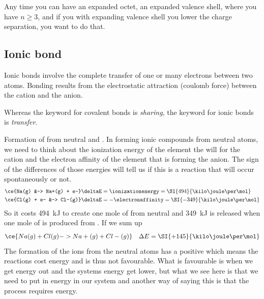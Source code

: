 \documentclass[../mit-general-chemistry.tex]{subfiles}
\begin{document}
Any time you can have an expanded octet, an expanded valence shell,
where you have $n \geq 3$, and if you with expanding valence shell you
lower the charge separation, you want to do that.







\subsection{Ionic bond}


Ionic bonds involve the complete transfer of one or many electrons
between two atoms. Bonding results from the electrostatic attraction
(coulomb force) between the cation and the anion.

\begin{remark}
  Whereas the keyword for covalent bonds is {\em sharing}, the keyword
  for ionic bonds is {\em transfer}.
\end{remark}

Formation of  from neutral  and . In forming
ionic compounds from neutral atoms, we need to think about the
ionization energy of the element the will for the cation and the
electron affinity of the element that is forming the anion. The sign
of the differences of those energies will tell us if this is a
reaction that will occur spontaneously or not.
\begin{align*}
  \ce{Na(g) &-> Na+(g) + e-} & \deltaE = \ionizationenergy = \SI{494}{\kilo\joule\per\mol} \\
  \ce{Cl(g) + e- &-> Cl-(g)} & \deltaE = -\electronaffinity = \SI{-349}{\kilo\joule\per\mol} \\
\end{align*}
So it costs \SI{494}{\kilo\joule} to create one mole of  from
neutral  and \SI{349}{\kilo\joule} is released when one mole of
 is produced from . If we sum up
\begin{align*}
  &\ce{Na(g) + Cl(g) -> Na+(g) + Cl-(g)} & \Delta E =
  \SI{+145}{\kilo\joule\per\mol} \\
\end{align*}
The formation of the ions from the neutral atoms has a positive
\deltaE which means the reactions cost energy and is thus not
favourable. What is favourable is when we get energy out and the
systems energy get lower, but what we see here is that we need to put
in energy in our system and another way of saying this is that the
process requires energy.
\end{document}
